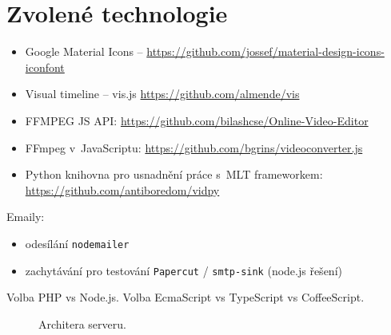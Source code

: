 \section{Zvolené technologie}
\begin{itemize}
\item Google Material Icons -- \url{https://github.com/jossef/material-design-icons-iconfont}
\item Visual timeline -- vis.js \url{https://github.com/almende/vis}
\item FFMPEG JS API: \url{https://github.com/bilashcse/Online-Video-Editor}
\item FFmpeg v~JavaScriptu: \url{https://github.com/bgrins/videoconverter.js}
\item Python knihovna pro usnadnění práce s~MLT frameworkem: \url{https://github.com/antiboredom/vidpy}
\end{itemize}
Emaily:
\begin{itemize}
\item odesílání \texttt{nodemailer}
\item zachytávání pro testování \texttt{Papercut} / \texttt{smtp-sink} (node.js řešení)
\end{itemize}

Volba PHP vs Node.js. Volba EcmaScript vs TypeScript vs CoffeeScript.
\begin{figure}[h]
	\centering
	\caption{Architera serveru.}\label{img:server-architektura}
\end{figure}

